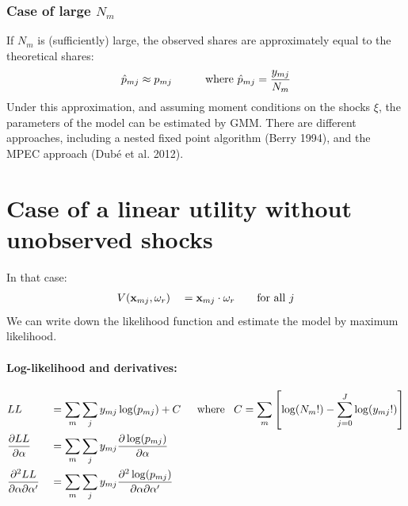 \documentclass[12pt]{article}
\begin{document}
\subsubsection{Case of large $N_m$}
If $N_m$ is (sufficiently) large, the observed shares are approximately equal to the theoretical shares:
\begin{equation}
	\hat{p}_{mj} \approx p_{mj} \hspace*{30pt} \text{where } \hat{p}_{mj} = \frac{y_{mj}}{N_m}
\end{equation}
Under this approximation, and assuming moment conditions on the shocks $\xi$, the parameters of the model can be estimated by GMM. There are different approaches, including a nested fixed point algorithm (Berry 1994), and the MPEC approach (Dubé et al. 2012).



\section{Case of a linear utility without unobserved shocks}
In that case:
\begin{equation}
\begin{aligned}
	& V(\textbf{x}_{mj}, \omega_r) && = \textbf{x}_{mj} \cdot \omega_r \hspace*{20pt} \text{for all } j \\
\end{aligned}
\end{equation}
We can write down the likelihood function and estimate the model by maximum likelihood.


\paragraph{Log-likelihood and derivatives: \\}
\begin{equation}
\begin{aligned}
	& LL && = \sum_m \sum_{j} y_{mj} \log(p_{mj}) + C \hspace*{15pt}  \text{where } \hspace*{5pt} C =\sum_m \left[ \log(N_m!) - \sum_{j=0}^J \log(y_{mj}!) \right] \\
	& \frac{\partial LL}{\partial \alpha} && = \sum_m \sum_{j} y_{mj} \frac{\partial \log(p_{mj})}{\partial \alpha} \\
	& \frac{\partial^2 LL}{\partial \alpha \partial \alpha'} && = \sum_m \sum_{j} y_{mj} \frac{\partial^2 \log(p_{mj})}{\partial \alpha \partial \alpha'} \\
\end{aligned}
\end{equation}
\end{document}

